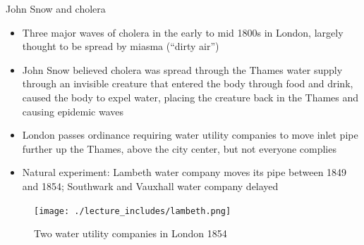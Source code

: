 \documentclass{beamer}
\begin{document}
\begin{frame}{John Snow and cholera}

\begin{itemize}
\item Three major waves of cholera in the early to mid 1800s in London, largely thought to be spread by miasma (``dirty air'')
\item John Snow believed cholera was spread through the Thames water supply through an invisible creature that entered the body through food and drink, caused the body to expel water, placing the creature back in the Thames and causing epidemic waves
\item London passes ordinance requiring water utility companies to move inlet pipe further up the Thames, above the city center, but not everyone complies
\item Natural experiment: Lambeth water company moves its pipe between 1849 and 1854; Southwark and Vauxhall water company delayed
\end{itemize}

\end{frame}


\begin{frame}

	\begin{figure}
	\caption{Two water utility companies in London 1854}
	\texttt{[image: ./lecture\_includes/lambeth.png]}
	\end{figure}


\end{frame}
\end{document}
